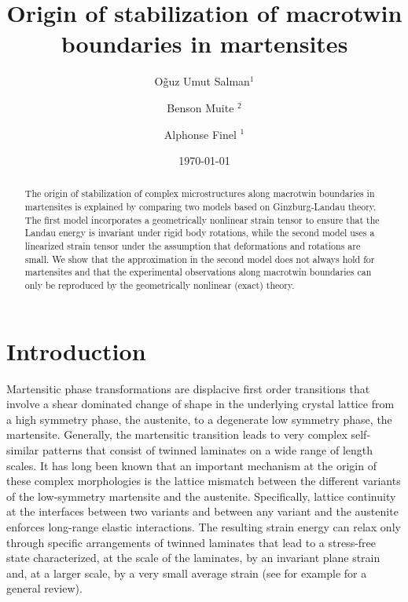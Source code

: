 \documentclass[twocolumn,amsmath,amssymb]{revtex4}
\begin{document}
%
\title{Origin of stabilization of macrotwin boundaries in martensites}
\author{O\~guz Umut Salman$^{1}$}
\author{Benson Muite $^{2}$}
\author{Alphonse Finel $^{1}$}

%
\date{\today}
\begin{abstract}
The origin of stabilization of complex microstructures along macrotwin boundaries in martensites is explained by  comparing two models based on Ginzburg-Landau theory. The first model incorporates a geometrically nonlinear strain tensor to ensure that the Landau energy is invariant under rigid body rotations, while the second model uses a linearized strain tensor under the assumption that deformations and rotations are small. We show that the approximation in the second model does not always hold for martensites and that the  experimental observations along macrotwin boundaries can only be reproduced by the geometrically nonlinear (exact) theory.
\end{abstract}
\maketitle
\section{\label{sec:level1}Introduction}

Martensitic phase transformations are displacive first order transitions that involve a shear dominated change of shape in the underlying crystal lattice from a high symmetry phase, the austenite, to a degenerate low symmetry phase, the martensite. Generally, the martensitic transition leads to very complex self-similar patterns that consist of twinned laminates on a wide range of length scales. It has long been known that an important mechanism at the origin of these complex morphologies is the lattice mismatch between the different variants of the low-symmetry martensite and the austenite. Specifically, lattice continuity at the interfaces between two variants and between any variant and the austenite enforces long-range elastic interactions. The resulting strain energy can relax only through specific arrangements of twinned laminates that lead to a stress-free state characterized, at the scale of the laminates, by an invariant plane strain and, at a larger scale, by a very small average strain (see for example \cite{Bha03} for a general review).
\end{document}
